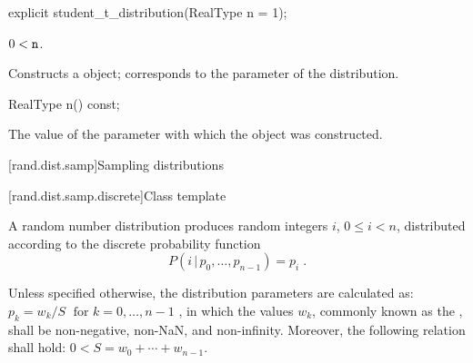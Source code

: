 %
\begin{itemdecl}
explicit student_t_distribution(RealType n = 1);
\end{itemdecl}

\begin{itemdescr}
\pnum\requires
 $ 0 < \texttt{n} $.

\pnum\effects Constructs a  object;
  corresponds to the parameter of the distribution.
\end{itemdescr}

%
%
\begin{itemdecl}
RealType n() const;
\end{itemdecl}

\begin{itemdescr}
\pnum\returns The value of the  parameter
 with which the object was constructed.
\end{itemdescr}%
%



[rand.dist.samp]{Sampling distributions}%
%



[rand.dist.samp.discrete]{Class template }%
%

\pnum
A  random number distribution
produces random integers $i$, $0 \leq i < n$,
distributed according to
the discrete probability function%
%
\[%
 P(i\,|\,p_0,\ldots,p_{n-1})
      = p_i
\; \mbox{.}
\]

\pnum
Unless specified otherwise,
the distribution parameters are calculated as:
 $p_k = {w_k / S} \; \mbox{  for } k = 0, \ldots, n\!-\!1$ ,
in which
the values $w_k$,
commonly known as the %
%
%
, shall be non-negative, non-NaN, and non-infinity.
Moreover, the following relation shall hold:
 $ 0 < S = w_0 + \cdots + w_{n-1} $.

